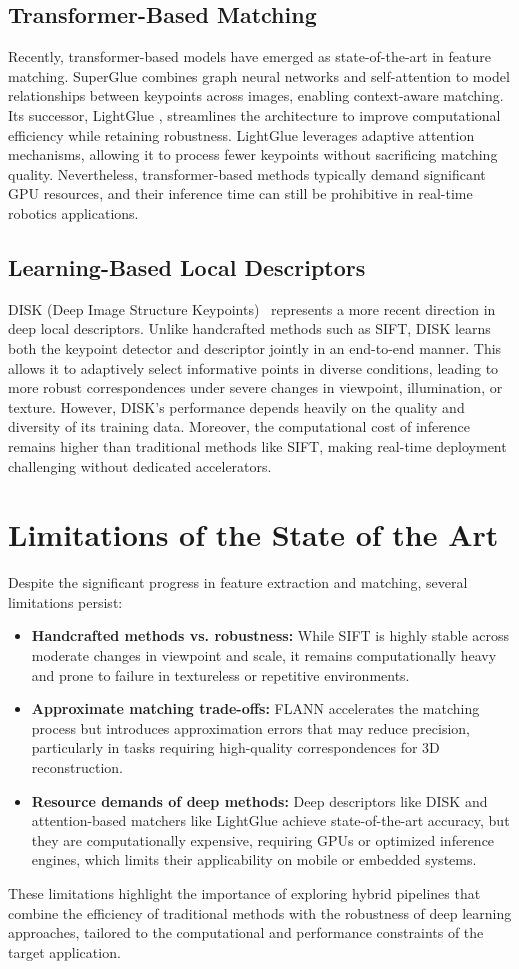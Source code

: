 \documentclass[report.tex]{subfiles}
\begin{document}
\subsection{Transformer-Based Matching}
Recently, transformer-based models have emerged as state-of-the-art in feature matching. SuperGlue \cite{sarlin2020superglue} combines graph neural networks and self-attention to model relationships between keypoints across images, enabling context-aware matching. Its successor, LightGlue \cite{lindenberger2023lightgluelocalfeaturematching}, streamlines the architecture to improve computational efficiency while retaining robustness. LightGlue leverages adaptive attention mechanisms, allowing it to process fewer keypoints without sacrificing matching quality. Nevertheless, transformer-based methods typically demand significant GPU resources, and their inference time can still be prohibitive in real-time robotics applications.

\subsection{Learning-Based Local Descriptors}
DISK (Deep Image Structure Keypoints)~\cite{tyszkiewicz2020disk} represents a more recent direction in deep local descriptors. Unlike handcrafted methods such as SIFT, DISK learns both the keypoint detector and descriptor jointly in an end-to-end manner. This allows it to adaptively select informative points in diverse conditions, leading to more robust correspondences under severe changes in viewpoint, illumination, or texture. However, DISK’s performance depends heavily on the quality and diversity of its training data. Moreover, the computational cost of inference remains higher than traditional methods like SIFT, making real-time deployment challenging without dedicated accelerators.

\section{Limitations of the State of the Art}

Despite the significant progress in feature extraction and matching, several limitations persist:
\begin{itemize}
    \item \textbf{Handcrafted methods vs. robustness:} While SIFT is highly stable across moderate changes in viewpoint and scale, it remains computationally heavy and prone to failure in textureless or repetitive environments.
    \item \textbf{Approximate matching trade-offs:} FLANN accelerates the matching process but introduces approximation errors that may reduce precision, particularly in tasks requiring high-quality correspondences for 3D reconstruction.
    \item \textbf{Resource demands of deep methods:} Deep descriptors like DISK and attention-based matchers like LightGlue achieve state-of-the-art accuracy, but they are computationally expensive, requiring GPUs or optimized inference engines, which limits their applicability on mobile or embedded systems.
\end{itemize}

These limitations highlight the importance of exploring hybrid pipelines that combine the efficiency of traditional methods with the robustness of deep learning approaches, tailored to the computational and performance constraints of the target application.
\end{document}
